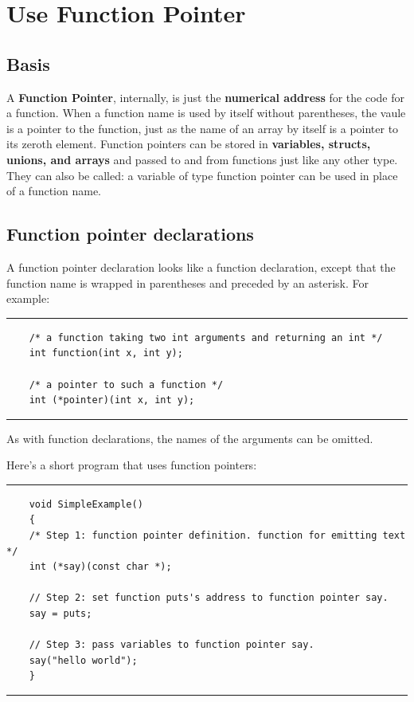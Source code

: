 	
	\section{Use Function Pointer}
	\subsection{Basis}
	A \textbf{Function Pointer}, internally, is just the \textbf{numerical address} for the code for a function. When a function name is used by itself without parentheses, the vaule is a pointer to the function, just as the name of an array by itself is a pointer to its zeroth element. Function pointers can be stored in \textbf{variables, structs, unions, and arrays} and passed to and from functions just like any other type. They can also be called: a variable of type function pointer can be used in place of a function name.
	
	\subsection{Function pointer declarations}
	A function pointer declaration looks like a function declaration, except that the function name is wrapped in parentheses and preceded by an asterisk. For example:
	
	\noindent\vspace{1em}\hrule
	\begin{verbatim}
	/* a function taking two int arguments and returning an int */
	int function(int x, int y);
	
	/* a pointer to such a function */
	int (*pointer)(int x, int y);
	\end{verbatim}
	\noindent\hrule\vspace{1em}
	
	As with function declarations, the names of the arguments can be omitted.
	
	Here's a short program that uses function pointers:
	
	\noindent\vspace{1em}\hrule
	\begin{verbatim}
	void SimpleExample()
	{
	/* Step 1: function pointer definition. function for emitting text */
	int (*say)(const char *);
	
	// Step 2: set function puts's address to function pointer say.
	say = puts;
	
	// Step 3: pass variables to function pointer say.
	say("hello world");
	}
	\end{verbatim}
	\noindent\hrule\vspace{1em}
	

